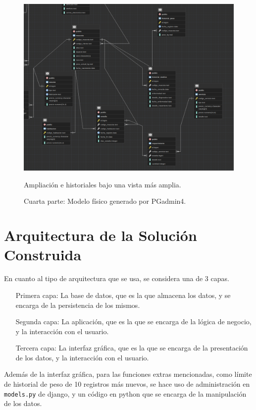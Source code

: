 \documentclass[
  12pt,
  hidelinks,
  a4paper,
  headings=standardclasses,
  headings=big,
  spanish
]{scrartcl}
\begin{document}
\begin{figure}[H]
  \centering
  \includegraphics[width=1\textwidth]{pgadmin-4.png}
  \caption{Cuarta parte: Modelo físico generado por PGadmin4.}
  \medskip
  \small
  Ampliación e historiales bajo una vista más amplia.
\end{figure}
\pagebreak
\section{Arquitectura de la Solución Construida} %

En cuanto al tipo de arquitectura que se usa, se considera una de 3 capas.

\begin{enumerate}
  \item[Primera capa:] La base de datos, que es la que almacena los datos, y se encarga de la persistencia de los mismos.
  \item[Segunda capa:] La aplicación, que es la que se encarga de la lógica de negocio, y la interacción con el usuario.
  \item[Tercera capa:] La interfaz gráfica, que es la que se encarga de la presentación de los datos, y la interacción con el usuario.
\end{enumerate}

Además de la interfaz gráfica, para las funciones extras mencionadas, como límite de historial de peso de 10 registros más nuevos, se hace uso de administración en \texttt{models.py} de django, y un código en python que se encarga de la manipulación de los datos.
\end{document}

